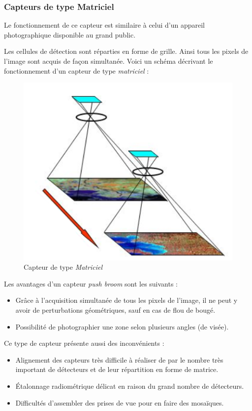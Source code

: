 \documentclass[a4paper, 10pt]{report}
\begin{document}
\subsubsection{Capteurs de type Matriciel}
Le fonctionnement de ce capteur est similaire à celui d'un appareil photographique disponible au grand public.

Les cellules de détection sont réparties en forme de grille. Ainsi tous les pixels de l'image sont acquis de façon simultanée.
Voici un schéma décrivant le fonctionnement d'un capteur de type \emph{matriciel} :
\begin{figure}[H]
	\begin{center}
		\includegraphics[scale=0.7]{Images/CCD_Sensor.png}
		\caption{Capteur de type \emph{Matriciel}}
	\end{center}
\end{figure}

Les avantages d'un capteur \emph{push broom} sont les suivants :
\begin{itemize}
	\item Grâce à l'acquisition simultanée de tous les pixels de l'image, il ne peut y avoir de perturbations géométriques, sauf en cas de flou de bougé.
	\item Possibilité de photographier une zone selon plusieurs angles (de visée).
\end{itemize}
Ce type de capteur présente aussi des inconvénients :
\begin{itemize}
	\item Alignement des capteurs très difficile à réaliser de par le nombre très important de détecteurs et de leur répartition en forme de matrice.
	\item Étalonnage radiométrique délicat en raison du grand nombre de détecteurs.
	\item Difficultés d'assembler des prises de vue pour en faire des mosaïques.
\end{itemize}
\end{document}
